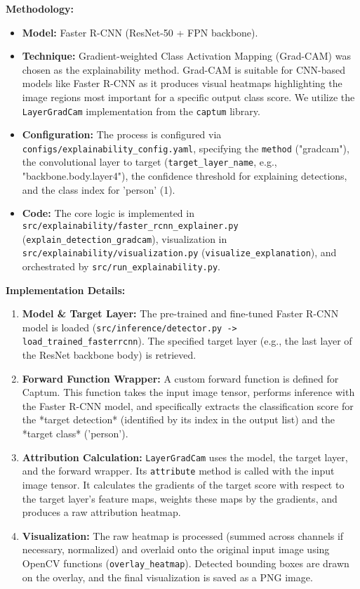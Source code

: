 \textbf{Methodology:}
\begin{itemize}
    \item   \textbf{Model:} Faster R-CNN (ResNet-50 + FPN backbone).
    \item   \textbf{Technique:} Gradient-weighted Class Activation Mapping (Grad-CAM) was chosen as the explainability method. Grad-CAM is suitable for CNN-based models like Faster R-CNN as it produces visual heatmaps highlighting the image regions most important for a specific output class score. We utilize the \texttt{LayerGradCam} implementation from the \texttt{captum} library.
    \item   \textbf{Configuration:} The process is configured via \texttt{configs/explainability\_config.yaml}, specifying the \texttt{method} ("gradcam"), the convolutional layer to target (\texttt{target\_layer\_name}, e.g., "backbone.body.layer4"), the confidence threshold for explaining detections, and the class index for 'person' (1).
    \item   \textbf{Code:} The core logic is implemented in \texttt{src/explainability/faster\_rcnn\_explainer.py} (\texttt{explain\_detection\_gradcam}), visualization in \texttt{src/explainability/visualization.py} (\texttt{visualize\_explanation}), and orchestrated by \texttt{src/run\_explainability.py}.
\end{itemize}

\textbf{Implementation Details:}
\begin{enumerate}
    \item  \textbf{Model \& Target Layer:} The pre-trained and fine-tuned Faster R-CNN model is loaded (\texttt{src/inference/detector.py -> load\_trained\_fasterrcnn}). The specified target layer (e.g., the last layer of the ResNet backbone body) is retrieved.
    \item  \textbf{Forward Function Wrapper:} A custom forward function is defined for Captum. This function takes the input image tensor, performs inference with the Faster R-CNN model, and specifically extracts the classification score for the *target detection* (identified by its index in the output list) and the *target class* ('person').
    \item  \textbf{Attribution Calculation:} \texttt{LayerGradCam} uses the model, the target layer, and the forward wrapper. Its \texttt{attribute} method is called with the input image tensor. It calculates the gradients of the target score with respect to the target layer's feature maps, weights these maps by the gradients, and produces a raw attribution heatmap.
    \item  \textbf{Visualization:} The raw heatmap is processed (summed across channels if necessary, normalized) and overlaid onto the original input image using OpenCV functions (\texttt{overlay\_heatmap}). Detected bounding boxes are drawn on the overlay, and the final visualization is saved as a PNG image.
\end{enumerate}

